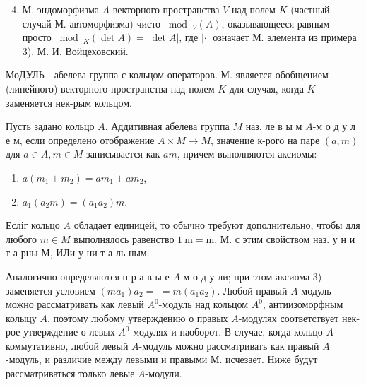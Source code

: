\documentclass[10pt]{article}
\begin{document}
\begin{enumerate}

  \setcounter{enumi}{3}

  \item М. эндоморфизма $A$ векторного пространства $V$ над полем $K$ (частный случай М. автоморфизма) чисто $\bmod _{V}(A)$, оказывающееся равным просто $\bmod _{K}(\operatorname{det} A)=|\operatorname{det} A|$, где $|\cdot|$ означает М. элемента из примера 3). М. И. Войцеховский.

\end{enumerate}



МоДУЛЬ - абелева группа с кольцом операторов. М. является обобщением (линейного) векторного пространства над полем $K$ для случая, когда $K$ заменяется нек-рым кольцом.



Пусть задано кольцо $A$. Аддитивная абелева группа $M$ наз. ле в ы м $A$-м о д у л е м, если определено отображение $A \times M \rightarrow M$, значение к-рого на паре $(a, m)$ для $a \in A, m \in M$ записывается как $a m$, причем выполняются аксиомы:



\begin{enumerate}

  \item $a\left(m_{1}+m_{2}\right)=a m_{1}+a m_{2}$,



  \item $a_{1}\left(a_{2} m\right)=\left(a_{1} a_{2}\right) m$.



\end{enumerate}



Есліг кольцо $A$ обладает единицей, то обычно требуют дополнительно, чтобы для любого $m \in M$ выполнялось равенство $1 \mathrm{~m}=\mathrm{m}$. М. с этим свойством наз. у н и т а рны М, ИЛи у ни т а ль ным.



Аналогично определяются п р а в ы е $A$-м о д у ли; при этом аксиома 3) заменяется условием $\left(m a_{1}\right) a_{2}=$ $=m\left(a_{1} a_{2}\right)$. Любой правый $A$-модуль можно рассматривать как левый $A^{0}$-модуль над кольцом $A^{0}$, антиизоморфным колыцу $A$, поэтому любому утверждению о правых $A$-модулях соответствует нек-рое утверждение о левых $A^{0}$-модулях и наоборот. В случае, когда кольцо $A$ коммутативно, любой левый $A$-модуль можно рассматривать как правый $A$-модуль, и различие между левыми и правыми М. исчезает. Ниже будут рассматриваться только левые $A$-модули.
\end{document}

